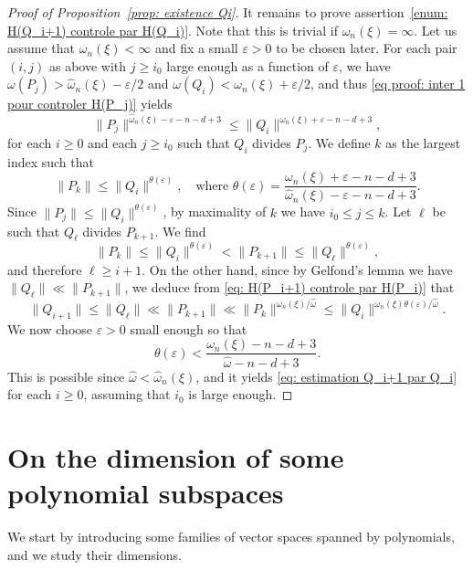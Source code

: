 \documentclass[JEP,XML,SOM,Unicode,NoFloatCountersInSection,published]{cedram}
\newcommand\ee{\varepsilon}
\newcommand\homega{\widehat{\omega}}\newcommand\HH{\mathcal{H}}
\newcommand{\normH}[1]{\|#1\|}
\theoremstyle{definition}
\theoremstyle{plain}
\begin{document}
\begin{proof}[Proof of Proposition~\ref{prop: existence Qi}]
It remains to prove assertion~\eqref{enum: H(Q_i+1) controle par H(Q_i)}. Note that this is trivial if $\omega_n(\xi) = \infty$. Let us assume that $\omega_n(\xi) < \infty$ and fix a small $\ee > 0$ to be chosen later. For each pair $(i,j)$ as above with $j \geq i_0$ large enough as a function of $\ee$, we have $\omega(P_j) > \homega_n(\xi)-\ee/2$ and $\omega(Q_i) < \omega_n(\xi)+\ee/2$, and thus \eqref{eq proof: inter 1 pour controler H(P_j)} yields
\begin{equation*}
\normH{P_j}^{\homega_n(\xi)-\ee-n-d+3} \leq \normH{Q_i}^{\omega_n(\xi)+\ee-n-d+3},
\end{equation*}
for each $i \geq 0$ and each $j\geq i_0$ such that $Q_i$ divides $P_j$. We define $k$ as the largest index such that
\begin{equation*}
\normH{P_k} \leq \normH{Q_i}^{\theta(\ee)},\quad \textrm{where } \theta(\ee) = \frac{\omega_n(\xi)+\ee-n-d+3}{\homega_n(\xi)-\ee-n-d+3}.
\end{equation*}
Since $\normH{P_j} \leq \normH{Q_i}^{\theta(\ee)}$, by maximality of $k$ we have $i_0\leq j\leq k$. Let $\ell$ be such that $Q_\ell$ divides $P_{k+1}$. We find
\begin{equation*}
\normH{P_k} \leq \normH{Q_i}^{\theta(\ee)} < \normH{P_{k+1}} \leq \normH{Q_\ell}^{\theta(\ee)},
\end{equation*}
and therefore $\ell \geq i+1$. On the other hand, since by Gelfond's lemma we have $\normH{Q_\ell} \ll \normH{P_{k+1}}$, we deduce from \eqref{eq: H(P_i+1) controle par H(P_i)} that
\begin{equation*}
\normH{Q_{i+1}} \leq \normH{Q_\ell} \ll \normH{P_{k+1}} \ll \normH{P_k}^{\omega_n(\xi)/\homega}\leq \normH{Q_i}^{\omega_n(\xi)\theta(\ee) /\homega}.
\end{equation*}
We now choose $\ee>0$ small enough so that
\begin{equation*}
\theta(\ee) < \frac{\omega_n(\xi)-n-d+3}{\homega -n-d+3}.
\end{equation*}
This is possible since $\homega < \homega_n(\xi)$, and it yields \eqref{eq: estimation Q_i+1 par Q_i} for each $i\geq 0$, assuming that $i_0$ is large enough.
\end{proof}

\section{On the dimension of some polynomial subspaces}
\label{section: espaces V_N}

We start by introducing some families of vector spaces spanned by polynomials, and we study their dimensions.
\end{document}
